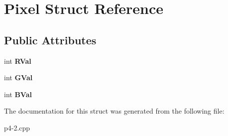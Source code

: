 \hypertarget{structPixel}{}\section{Pixel Struct Reference}
\label{structPixel}
\subsection*{Public Attributes}
\begin{DoxyCompactItemize}
\item 
\mbox{\label{structPixel_ab04dc82f289dbd018690ab4e3ff8414a}} 
int {\bfseries R\+Val}
\item 
\mbox{\label{structPixel_a5a7edb9f06f9d6b44f5e0e82f84a7e71}} 
int {\bfseries G\+Val}
\item 
\mbox{\label{structPixel_a1ebb93a408d3fcc17dd5f1926027ae41}} 
int {\bfseries B\+Val}
\end{DoxyCompactItemize}


The documentation for this struct was generated from the following file\+:\begin{DoxyCompactItemize}
\item 
p4-\/2.\+cpp\end{DoxyCompactItemize}
